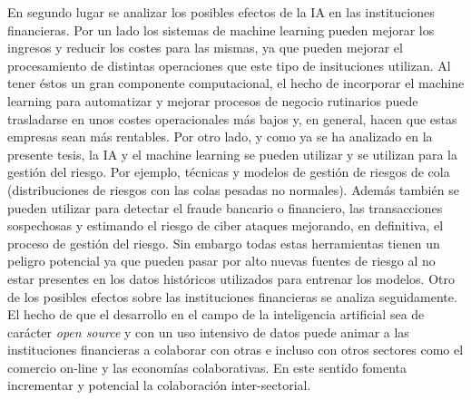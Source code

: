 \documentclass[]{article}
\begin{document}
En segundo lugar se analizar los posibles efectos de la IA en las
instituciones financieras. Por un lado los sistemas de machine learning
pueden mejorar los ingresos y reducir los costes para las mismas, ya que
pueden mejorar el procesamiento de distintas operaciones que este tipo
de insituciones utilizan. Al tener éstos un gran componente
computacional, el hecho de incorporar el machine learning para
automatizar y mejorar procesos de negocio rutinarios puede trasladarse
en unos costes operacionales más bajos y, en general, hacen que estas
empresas sean más rentables. Por otro lado, y como ya se ha analizado en
la presente tesis, la IA y el machine learning se pueden utilizar y se
utilizan para la gestión del riesgo. Por ejemplo, técnicas y modelos de
gestión de riesgos de cola (distribuciones de riesgos con las colas
pesadas no normales). Además también se pueden utilizar para detectar el
fraude bancario o financiero, las transacciones sospechosas y estimando
el riesgo de ciber ataques mejorando, en definitiva, el proceso de
gestión del riesgo. Sin embargo todas estas herramientas tienen un
peligro potencial ya que pueden pasar por alto nuevas fuentes de riesgo
al no estar presentes en los datos históricos utilizados para entrenar
los modelos. Otro de los posibles efectos sobre las instituciones
financieras se analiza seguidamente. El hecho de que el desarrollo en el
campo de la inteligencia artificial sea de carácter \emph{open source} y
con un uso intensivo de datos puede animar a las instituciones
financieras a colaborar con otras e incluso con otros sectores como el
comercio on-line y las economías colaborativas. En este sentido fomenta
incrementar y potencial la colaboración inter-sectorial.
\end{document}
